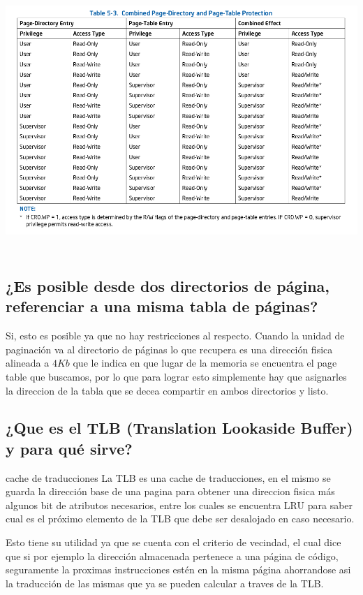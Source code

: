 \documentclass[a4paper,10pt,twoside]{article}
\begin{document}
\includegraphics[height=10cm]{privilegios.png} 

\subsection{¿Es posible desde dos directorios de página, referenciar a una misma tabla de páginas?}
Si, esto es posible ya que no hay restricciones al respecto. Cuando la unidad de paginación va al directorio de páginas lo que recupera es una dirección fisica alineada a $4Kb$ que le indica en que lugar de la memoria se encuentra el page table que buscamos, por lo que para lograr esto simplemente hay que asignarles la direccion de la tabla que se decea compartir en ambos directorios y listo.

\subsection{¿Que es el TLB (Translation Lookaside Buffer) y para qué sirve?}cache de traducciones
La TLB es una cache de traducciones, en el mismo se guarda la dirección base de una pagina para obtener una direccion fisica más algunos bit de atributos necesarios, entre los cuales se encuentra LRU para saber cual es el próximo elemento de la TLB que debe ser desalojado en caso necesario.

Esto tiene su utilidad ya que se cuenta con el criterio de vecindad, el cual dice que si por ejemplo la dirección almacenada pertenece a una página de código, seguramente la proximas instrucciones estén en la misma página ahorrandose asi la traducción de las mismas que ya se pueden calcular a traves de la TLB. 
\end{document}
